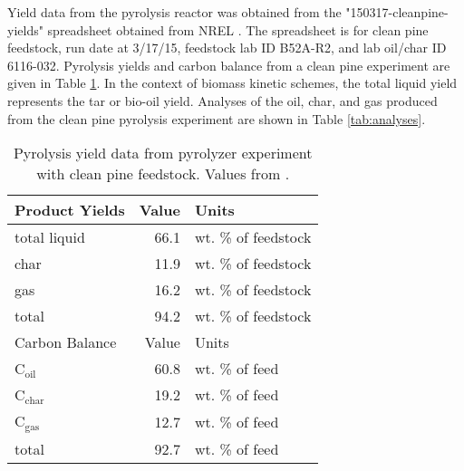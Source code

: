 Yield data from the pyrolysis reactor was obtained from the "150317-cleanpine-yields" spreadsheet obtained from NREL \cite{French-2019}. The spreadsheet is for clean pine feedstock, run date at 3/17/15, feedstock lab ID B52A-R2, and lab oil/char ID 6116-032. Pyrolysis yields and carbon balance from a clean pine experiment are given in Table \ref{tab:yields}. In the context of biomass kinetic schemes, the total liquid yield represents the tar or bio-oil yield. Analyses of the oil, char, and gas produced from the clean pine pyrolysis experiment are shown in Table \ref{tab:analyses}.

\begin{table}[H]
    \centering
    \caption{Pyrolysis yield data from pyrolyzer experiment with clean pine feedstock. Values from \cite{French-2019}.}
    \label{tab:yields}
    \begin{tabular}{lrl}
        \toprule
        Product Yields & Value & Units \\
        \midrule
        total liquid & 66.1 & wt. \% of feedstock \\
        char & 11.9 & wt. \% of feedstock \\
        gas & 16.2 & wt. \% of feedstock \\
        total & 94.2 & wt. \% of feedstock \\
        \midrule
        Carbon Balance & Value & Units \\
        \midrule
        C$_\textrm{oil}$ & 60.8 & wt. \% of feed \\
        C$_\textrm{char}$ & 19.2 & wt. \% of feed \\
        C$_\textrm{gas}$ & 12.7 & wt. \% of feed \\
        total & 92.7 & wt. \% of feed \\
        \bottomrule
    \end{tabular}
\end{table}

